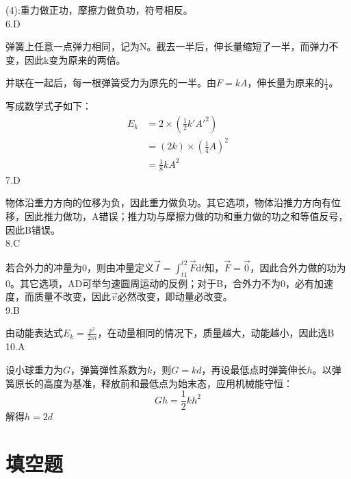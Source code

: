 \documentclass[b5paper,opensource]{./template/qyxf-book}
\newcommand{\di}[1]{\mathrm{d}#1}
\begin{document}
(4):重力做正功，摩擦力做负功，符号相反。\\
6.D\par
弹簧上任意一点弹力相同，记为N。截去一半后，伸长量缩短了一半，而弹力不变，因此k变为原来的两倍。\par
并联在一起后，每一根弹簧受力为原先的一半。由$F=kA$，伸长量为原来的$\frac{1}{4}$。\par
写成数学式子如下：
\begin{align*}
E_k &=2\times\left(\frac{1}{2}k'A'^2\right)\\
&=\left(2k\right)\times\left(\frac{1}{4}A\right)^2\\
&=\frac{1}{8}kA^2
\end{align*}
7.D\par 
物体沿重力方向的位移为负，因此重力做负功。其它选项，物体沿推力方向有位移，因此推力做功，A错误；推力功与摩擦力做的功和重力做的功之和等值反号，因此B错误。\\
8.C\par 
若合外力的冲量为0，则由冲量定义$\vec{I}=\int_{t1}^{t2}\vec{F}\di{t}$知，$\vec{F}=\vec{0}$，因此合外力做的功为0。其它选项，AD可举匀速圆周运动的反例；对于B，合外力不为0，必有加速度，而质量不改变，因此$\vec{v}$必然改变，即动量必改变。\\
9.B\par 
由动能表达式$E_k=\frac{p^2}{2m}$，在动量相同的情况下，质量越大，动能越小，因此选B\\
10.A\par 
设小球重力为$G$，弹簧弹性系数为$k$，则$G=kd$，再设最低点时弹簧伸长$h$。以弹簧原长的高度为基准，释放前和最低点为始末态，应用机械能守恒：
\[Gh=\frac{1}{2}kh^2\]
解得$h=2d$

\section{填空题}
\end{document}
